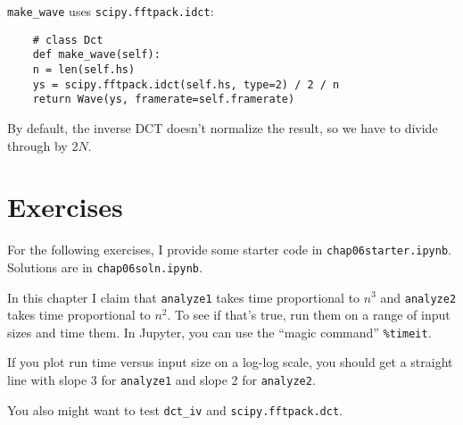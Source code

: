 \verb"make_wave" uses {\tt scipy.fftpack.idct}:

\begin{verbatim}
	# class Dct
	def make_wave(self):
	n = len(self.hs)
	ys = scipy.fftpack.idct(self.hs, type=2) / 2 / n
	return Wave(ys, framerate=self.framerate)
\end{verbatim}

By default, the inverse DCT doesn't normalize the result, so we have
to divide through by $2N$.


\section{Exercises}

For the following exercises, I provide some starter code in
{\tt chap06starter.ipynb}.
Solutions are in {\tt chap06soln.ipynb}.

\begin{exercise}
	In this chapter I claim that {\tt analyze1} takes time proportional
	to $n^3$ and {\tt analyze2} takes time proportional to $n^2$.  To
	see if that's true, run them on a range of input sizes and time
	them.  In Jupyter, you can use the ``magic command'' \verb"%timeit".
	
	If you plot run time versus input size on a log-log scale, you
	should get a straight line with slope 3 for  {\tt analyze1} and
	slope 2 for {\tt analyze2}.
	
	You also might want to test \verb"dct_iv"
	and {\tt scipy.fftpack.dct}.
	
\end{exercise}


